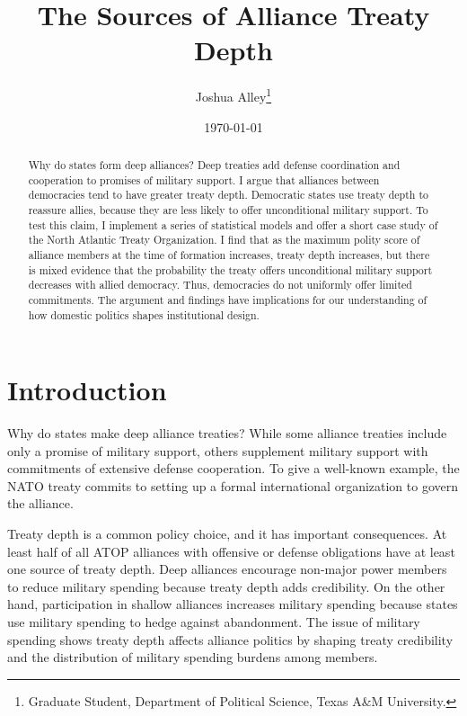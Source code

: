\documentclass[12pt]{article}
\title{\textbf{The Sources of Alliance Treaty Depth}}
\author{Joshua Alley\footnote{Graduate Student,
Department of Political Science, Texas A\&M University.}}
\date{\today}
\begin{document}
\maketitle 

\doublespace 

\begin{abstract}
Why do states form deep alliances? 
Deep treaties add defense coordination and cooperation to promises of military support.
I argue that alliances between democracies tend to have greater treaty depth. 
Democratic states use treaty depth to reassure allies, because they are less likely to offer unconditional military support.
To test this claim, I implement a series of statistical models and offer a short case study of the North Atlantic Treaty Organization.
I find that as the maximum polity score of alliance members at the time of formation increases, treaty depth increases, but there is mixed evidence that the probability the treaty offers unconditional military support decreases with allied democracy. 
Thus, democracies do not uniformly offer limited commitments. 
The argument and findings have implications for our understanding of how domestic politics shapes institutional design. 
\end{abstract}


\newpage 


\section{Introduction}


Why do states make deep alliance treaties? 
While some alliance treaties include only a promise of military support, others supplement military support with commitments of extensive defense cooperation. 
To give a well-known example, the NATO treaty commits to setting up a formal international organization to govern the alliance. 


Treaty depth is a common policy choice, and it has important consequences. 
At least half of all ATOP alliances with offensive or defense obligations have at least one source of treaty depth.
Deep alliances encourage non-major power members to reduce military spending because treaty depth adds credibility.  
On the other hand, participation in shallow alliances increases military spending because states use military spending to hedge against abandonment.
The issue of military spending shows treaty depth affects alliance politics by shaping treaty credibility and the distribution of military spending burdens among members. 
\end{document}
